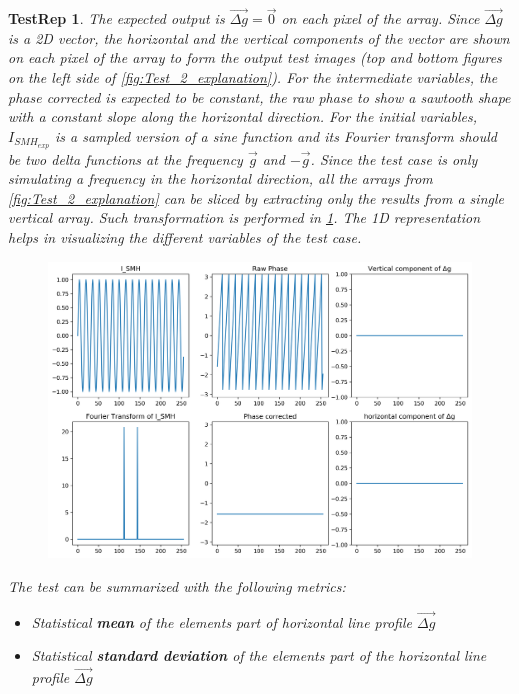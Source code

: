 \documentclass[12pt, titlepage]{article}
\newtheorem{TestRep}{TestRep}
\begin{document}
\begin{TestRep}
The expected output is $\overrightarrow{\Delta g} = \overrightarrow{0}$ on each pixel of the array. Since $\overrightarrow{\Delta g}$ is a 2D vector, the horizontal and the vertical components of the vector are shown on each pixel of the array to form the output test images (top and bottom figures on the left side of \cref{fig:Test_2_explanation}). For the intermediate variables, the phase corrected is expected to be constant, the raw phase to show a sawtooth shape with a constant slope along the horizontal direction. For the initial variables, $I_{SMH_{exp}}$ is a sampled version of a sine function and its Fourier transform should be two delta functions at the frequency $\overrightarrow{g}$ and $-\overrightarrow{g}$. Since the test case is only simulating a frequency in the horizontal direction, all the arrays from \cref{fig:Test_2_explanation} can be sliced by extracting only the results from a single vertical array. Such transformation is performed in \cref{fig:Test_2_explaination_1D}. The 1D representation helps in visualizing the different variables of the test case. 

\begin{figure}[H]
\begin{center}
\includegraphics[scale=0.5]{Figures/Test_2_explanation_1D.png}
\caption{}
\label{fig:Test_2_explaination_1D}
\end{center}
\end{figure}

The test can be summarized with the following metrics:
\begin{itemize}
\item Statistical \textbf{mean} of the elements part of horizontal line profile $\overrightarrow{\Delta g}$
\item Statistical \textbf{standard deviation} of the elements part of the horizontal line profile $\overrightarrow{\Delta g}$
\end{itemize}


\end{TestRep}
\end{document}
